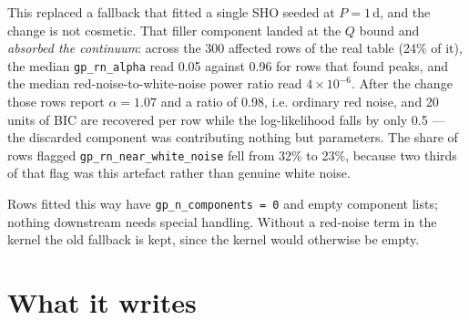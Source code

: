 \documentclass[11pt]{article}
\newcommand{\code}[1]{\texttt{#1}}
\begin{document}
This replaced a fallback that fitted a single SHO seeded at $P=1$\,d, and the change is not
cosmetic. That filler component landed at the $Q$ bound and \emph{absorbed the continuum}:
across the 300 affected rows of the real table (24\% of it), the median \code{gp\_rn\_alpha}
read 0.05 against 0.96 for rows that found peaks, and the median red-noise-to-white-noise
power ratio read $4\times10^{-6}$. After the change those rows report $\alpha = 1.07$ and a
ratio of 0.98, i.e. ordinary red noise, and 20 units of BIC are recovered per row while the
log-likelihood falls by only 0.5 --- the discarded component was contributing nothing but
parameters. The share of rows flagged \code{gp\_rn\_near\_white\_noise} fell from 32\% to
23\%, because two thirds of that flag was this artefact rather than genuine white noise.

Rows fitted this way have \code{gp\_n\_components = 0} and empty component lists; nothing
downstream needs special handling. Without a red-noise term in the kernel the old fallback is
kept, since the kernel would otherwise be empty.

\section{What it writes}
\end{document}
